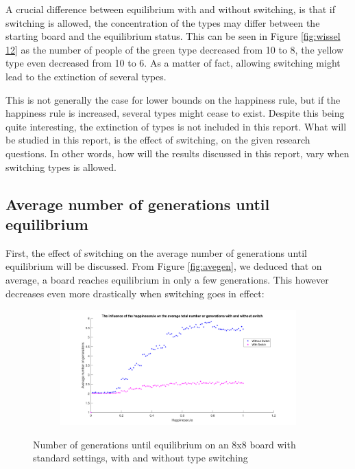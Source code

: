 A crucial difference between equilibrium with and without switching, is that if switching is allowed, the concentration of the types may differ between the starting board and the equilibrium status. 
This can be seen in Figure \ref{fig:wissel 12} as the number of people of the green type decreased from 10 to 8, the yellow type even decreased from 10 to 6. 
As a matter of fact, allowing switching might lead to the extinction of several types. 

This is not generally the case for lower bounds on the happiness rule, but if the happiness rule is increased, several types might cease to exist. Despite this being quite interesting, the extinction of types is not included in this report.
What will be studied in this report, is the effect of switching, on the given research questions. In other words, how will the results discussed in this report, vary when switching types is allowed. 
\newpage

\subsection{Average number of generations until equilibrium}\label{subsec:avegensw}
First, the effect of switching on the average number of generations until equilibrium will be discussed. 
From Figure \ref{fig:avegen}, we deduced that on average, a board reaches equilibrium in only a few generations. This however decreases even more drastically when switching goes in effect:

\begin{figure}[H]
	\centering
    \begin{subfigure}{0.9\textwidth}
        \includegraphics[width=\textwidth]{happinessrule-totaantgenwithswitchorwithoutswitch}
    \end{subfigure}
    \caption{Number of generations until equilibrium on an 8x8 board with standard settings, with and without type switching}
    \label{fig:AantGenS}
\end{figure}

